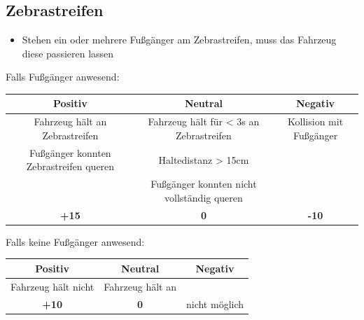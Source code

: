 \documentclass[a4paper, 11pt,usegeometry]{scrartcl}
\begin{document}
\subsection*{Zebrastreifen}
\begin{itemize}
  \item Stehen ein oder mehrere Fußgänger am Zebrastreifen, muss das Fahrzeug diese passieren lassen
\end{itemize}
Falls Fußgänger anwesend:
\begin{table}[H]
\begin{tabular}{|c|c|c|}
\hline
\rowcolor[HTML]{CACACA} 
\textbf{Positiv} & \textbf{Neutral} & \textbf{Negativ} \\ \hline
Fahrzeug hält an Zebrastreifen & Fahrzeug hält für < 3s an Zebrastreifen & Kollision mit Fußgänger \\ \hline
Fußgänger konnten Zebrastreifen queren & Haltedistanz > 15cm & \\ \hline
& Fußgänger konnten nicht vollständig queren & \\ \hline
\textbf{+15} & \textbf{0} & \textbf{-10} \\ \hline
\end{tabular}
\end{table}
Falls keine Fußgänger anwesend:
\begin{table}[H]
\begin{tabular}{|c|c|c|}
\hline
\rowcolor[HTML]{CACACA} 
\textbf{Positiv} & \textbf{Neutral} & \textbf{Negativ} \\ \hline
Fahrzeug hält nicht & Fahrzeug hält an &  \\ \hline
\textbf{+10} & \textbf{0} & nicht möglich \\ \hline
\end{tabular}
\end{table}
\end{document}
